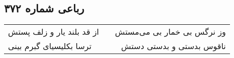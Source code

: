 \begin{center}
\section*{رباعی شماره ۳۷۲}
\label{sec:sh372}
\begin{longtable}{l p{0.5cm} r}
از قد بلند یار و زلف پستش
&&
وز نرگس بی خمار بی می‌مستش
\\
ترسا بکلیسیای گبرم بینی
&&
ناقوس بدستی و بدستی دستش
\\
\end{longtable}
\end{center}
